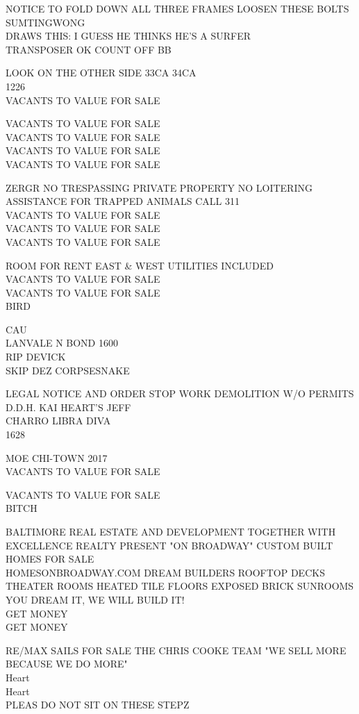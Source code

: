 \documentclass[10pt,letterpaper]{article}
\begin{document}
NOTICE TO FOLD DOWN ALL THREE FRAMES LOOSEN THESE BOLTS SUMTINGWONG\\
DRAWS THIS: I GUESS HE THINKS HE'S A SURFER\\
TRANSPOSER OK COUNT OFF BB

LOOK ON THE OTHER SIDE 33CA 34CA\\
1226\\
VACANTS TO VALUE FOR SALE

VACANTS TO VALUE FOR SALE\\
VACANTS TO VALUE FOR SALE\\
VACANTS TO VALUE FOR SALE\\
VACANTS TO VALUE FOR SALE

ZERGR NO TRESPASSING PRIVATE PROPERTY NO LOITERING ASSISTANCE FOR TRAPPED ANIMALS CALL 311\\
VACANTS TO VALUE FOR SALE\\
VACANTS TO VALUE FOR SALE\\
VACANTS TO VALUE FOR SALE

ROOM FOR RENT EAST \& WEST UTILITIES INCLUDED\\
VACANTS TO VALUE FOR SALE\\
VACANTS TO VALUE FOR SALE\\
BIRD

CAU\\
LANVALE N BOND 1600\\
RIP DEVICK\\
SKIP DEZ CORPSESNAKE

LEGAL NOTICE AND ORDER STOP WORK DEMOLITION W/O PERMITS\\
D.D.H. KAI HEART'S JEFF\\
CHARRO LIBRA DIVA\\
1628

MOE CHI{-}TOWN 2017\\
VACANTS TO VALUE FOR SALE

VACANTS TO VALUE FOR SALE\\
BITCH

BALTIMORE REAL ESTATE AND DEVELOPMENT TOGETHER WITH EXCELLENCE REALTY PRESENT "ON BROADWAY" CUSTOM BUILT HOMES FOR SALE\\
HOMESONBROADWAY.COM DREAM BUILDERS ROOFTOP DECKS THEATER ROOMS HEATED TILE FLOORS EXPOSED BRICK SUNROOMS YOU DREAM IT, WE WILL BUILD IT!\\
GET MONEY\\
GET MONEY

RE/MAX SAILS FOR SALE THE CHRIS COOKE TEAM "WE SELL MORE BECAUSE WE DO MORE"\\
Heart\\
Heart\\
PLEAS DO NOT SIT ON THESE STEPZ
\end{document}

